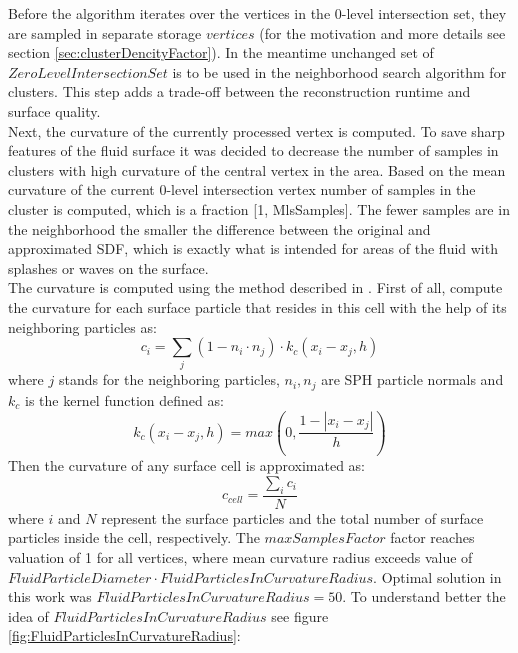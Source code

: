 Before the algorithm iterates over the vertices in the 0-level intersection set, they are sampled in separate storage $vertices$ (for the motivation and more details see section \ref{sec:clusterDencityFactor}). In the meantime unchanged set of $ZeroLevelIntersectionSet$ is to be used in the neighborhood search algorithm for clusters. This step adds a trade-off between the reconstruction runtime and surface quality.\\
Next, the curvature of the currently processed vertex is computed. To save sharp features of the fluid surface it was decided to decrease the number of samples in clusters with high curvature of the central vertex in the area. Based on the mean curvature of the current 0-level intersection vertex number of samples in the cluster is computed, which is a fraction [1, MlsSamples]. The fewer samples are in the neighborhood the smaller the difference between the original and approximated SDF, which is exactly what is intended for areas of the fluid with splashes or waves on the surface.\\
The curvature is computed using the method described in \cite{CurvatureComputation}. First of all, compute the curvature for each surface particle that resides in this cell with the help of its neighboring particles as:
\begin{equation}
	c_i = \sum_j{(1 - n_i \cdot n_j)\cdot k_c(x_i-x_j, h)}
\end{equation}
where $j$ stands for the neighboring particles, $n_i, n_j$ are SPH particle normals and
$k_c$ is the kernel function defined as:
\begin{equation}
	k_c(x_i-x_j, h) = max\left(0, \dfrac{1 - |x_i - x_j|}{h}\right)
\end{equation}
Then the curvature of any surface cell is approximated as:
\begin{equation}
	c_{cell} = \dfrac{\sum_i{c_i}}{N}
\end{equation}
where $i$ and $N$ represent the surface particles and the total number of surface particles inside the cell, respectively. The $maxSamplesFactor$ factor reaches valuation of 1 for all vertices, where mean curvature radius exceeds value of $FluidParticleDiameter \cdot FluidParticlesInCurvatureRadius$. Optimal solution in this work was $FluidParticlesInCurvatureRadius=50$. To understand better the idea of $FluidParticlesInCurvatureRadius$ see figure \ref{fig:FluidParticlesInCurvatureRadius}:
